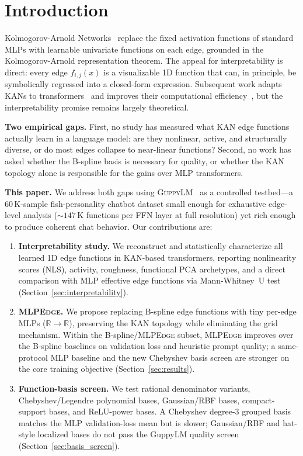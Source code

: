 \documentclass{article}
\newcommand{\fij}{f_{i,j}}
\newcommand{\mlpedge}{\textsc{MLPEdge}}
\newcommand{\guppylm}{\textsc{GuppyLM}}
\begin{document}
\section{Introduction}
\label{sec:intro}

Kolmogorov-Arnold Networks~\citep{liu2024kan} replace the fixed activation
functions of standard MLPs with learnable univariate functions on each edge,
grounded in the Kolmogorov-Arnold representation theorem.
The appeal for interpretability is direct: every edge $\fij(x)$ is a
visualizable 1D function that can, in principle, be symbolically regressed
into a closed-form expression.
Subsequent work adapts KANs to transformers~\citep{yang2024kat} and improves
their computational efficiency~\citep{blealtan2024efficientkan}, but the
interpretability promise remains largely theoretical.

\textbf{Two empirical gaps.}
First, no study has measured what KAN edge functions actually learn in a
language model: are they nonlinear, active, and structurally diverse, or do
most edges collapse to near-linear functions?
Second, no work has asked whether the B-spline basis is necessary for quality,
or whether the KAN topology alone is responsible for the gains over MLP
transformers.

\textbf{This paper.}
We address both gaps using \guppylm{}~\citep{guppylm60k} as a controlled
testbed---a 60\,K-sample fish-personality chatbot dataset small enough for
exhaustive edge-level analysis (${\sim}147$\,K functions per FFN layer at full
resolution) yet rich enough to produce coherent chat behavior.
Our contributions are:

\begin{enumerate}
  \item \textbf{Interpretability study.} We reconstruct and statistically
    characterize all learned 1D edge functions in KAN-based transformers,
    reporting nonlinearity scores (NLS), activity, roughness, functional PCA
    archetypes, and a direct comparison with MLP effective edge functions via
    Mann-Whitney~U test (Section~\ref{sec:interpretability}).

  \item \textbf{\mlpedge{}.} We propose replacing B-spline edge functions with
    tiny per-edge MLPs ($\mathbb{R}\to\mathbb{R}$), preserving the KAN
    topology while eliminating the grid mechanism.
    Within the B-spline/\mlpedge{} subset, \mlpedge{} improves over the
    B-spline baselines on validation loss and heuristic prompt quality; a
    same-protocol MLP baseline and the new Chebyshev basis screen are stronger
    on the core training objective (Section~\ref{sec:results}).

  \item \textbf{Function-basis screen.} We test rational denominator
    variants, Chebyshev/Legendre polynomial bases, Gaussian/RBF bases,
    compact-support bases, and ReLU-power bases.
    A Chebyshev degree-3 grouped basis matches the MLP validation-loss mean but
    is slower; Gaussian/RBF and hat-style localized bases do not pass the
    GuppyLM quality screen (Section~\ref{sec:basis_screen}).
\end{enumerate}
\end{document}
